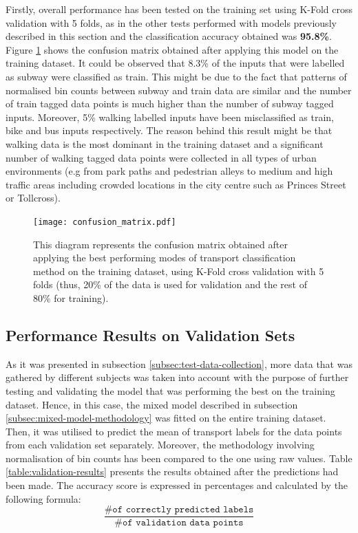 \documentclass[bsc,frontabs,twoside,singlespacing,parskip,deptreport]{infthesis}     %
\begin{document}
Firstly, overall performance has been tested on the training set using K-Fold cross validation with 5 folds, as in the other tests performed with models previously described in this section and the classification accuracy obtained was \textbf{95.8\%}. Figure \ref{fig:confusion_matrix} shows the confusion matrix obtained after applying this model on the training dataset. It could be observed that 8.3\% of the inputs that were labelled as subway were classified as train. This might be due to the fact that patterns of normalised bin counts between subway and train data are similar and the number of train tagged data points is much higher than the number of subway tagged inputs. Moreover, 5\% walking labelled inputs have been misclassified as train, bike and bus inputs respectively. The reason behind this result might be that walking data is the most dominant in the training dataset and a significant number of walking tagged data points were collected in all types of urban environments (e.g from park paths and pedestrian alleys to medium and high traffic areas including crowded locations in the city centre such as Princes Street or Tollcross).

\begin{figure}[h!]
  \center
  \texttt{[image: confusion\_matrix.pdf]}
  \caption{This diagram represents the confusion matrix obtained after applying the best performing modes of transport classification method on the training dataset, using K-Fold cross validation with 5 folds (thus, 20\% of the data is used for validation and the rest of 80\% for training).}
  \label{fig:confusion_matrix}
\end{figure}


\subsection{Performance Results on Validation Sets}

As it was presented in subsection \ref{subsec:test-data-collection}, more data that was gathered by different subjects was taken into account with the purpose of further testing and validating the model that was performing the best on the training dataset. Hence, in this case, the mixed model described in subsection \ref{subsec:mixed-model-methodology} was fitted on the entire training dataset. Then, it was utilised to predict the mean of transport labels for the data points from each validation set separately. Moreover, the methodology involving normalisation of bin counts has been compared to the one using raw values. Table \ref{table:validation-results} presents the results obtained after the predictions had been made. The accuracy score is expressed in percentages and calculated by the following formula: $$ \frac{\texttt{\# of correctly predicted labels}}{\texttt{\# of validation data points}} $$
\end{document}
